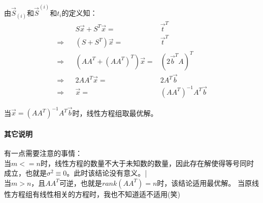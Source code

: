 \documentclass[UTF8]{ctexart}
\begin{document}
由$\vec{S}_{(i)}$和$\vec{S}^{(i)}$和$t_i$的定义知：
\begin{align*}
    && S\vec{x}+S^T\vec{x}=&\vec{t}^T \\
    \Rightarrow&& (S+S^T)\vec{x}=&\vec{t}^T \\
    \Rightarrow&& (AA^T+(AA^T)^T)\vec{x}=&(2\vec{b}^T A)^T \\
    \Rightarrow&& 2 AA^T \vec{x}=&2 A^T \vec{b} \\
    \Rightarrow&& \vec{x} =& (A A^T)^{-1} A^T \vec{b}
\end{align*}

当$\vec{x}=(A A^T)^{-1}A^T\vec{b}$时，线性方程组取最优解。

\paragraph*{其它说明}
有一点需要注意的事情：\\
当$m<=n$时，线性方程的数量不大于未知数的数量，因此存在解使得等号同时成立，也就是$\sigma^2\equiv{0}$。此时该结论没有意义。|\\
当$m>n$，且$A A^T$可逆，也就是$rank(A A^T)=n$时，该结论适用最优解。
当原线性方程组有线性相关的方程时，我也不知道适不适用(笑)
\end{document}
